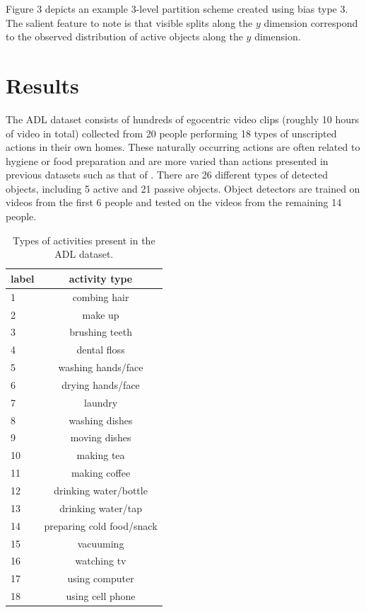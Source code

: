 \documentclass{bmvc2k}
\begin{document}
  Figure 3 depicts an example 3-level partition scheme created using bias
  type 3. The salient feature to note is that visible splits along the $y$
  dimension correspond to the observed distribution of active objects along
  the $y$ dimension.

\section{Results}
  The ADL dataset consists of hundreds of egocentric video clips
	(roughly 10 hours of video in total) collected from 20 people performing
	18 types of unscripted actions in their own homes. These naturally
  occurring
  actions are often related to hygiene or food preparation and are more
  varied than actions presented in previous datasets such as that of \cite{Fathi11}.
  There are 26 different 
	types of detected objects, including 5 active and 21 passive objects. 
  Object detectors are trained on videos from the
  first 6 people and tested on the videos from the remaining 14 people.
  
	\begin{table}
		\begin{center}
			\begin{tabular}{|l|c|}
				\hline \hline
        label & activity type \\
        \hline
        1 & combing hair \\
        \hline
        2 & make up \\
        \hline
        3 & brushing teeth \\
        \hline
        4 & dental floss \\
        \hline
        5 & washing hands/face \\
        \hline
        6 & drying hands/face \\
        \hline
        7 & laundry \\
        \hline
        8 & washing dishes \\
        \hline
        9 & moving dishes \\
        \hline
       10 & making tea \\
        \hline
       11 & making coffee \\
        \hline
       12 & drinking water/bottle \\
        \hline
       13 & drinking water/tap \\
        \hline
       14 & preparing cold food/snack \\
        \hline
       15 & vacuuming \\
        \hline
       16 & watching tv \\
        \hline
       17 & using computer \\
        \hline
       18 & using cell phone \\
				\hline
			\end{tabular}
		\end{center}
		\caption{Types of activities present in the ADL dataset.}
	\end{table}
  
\end{document}
